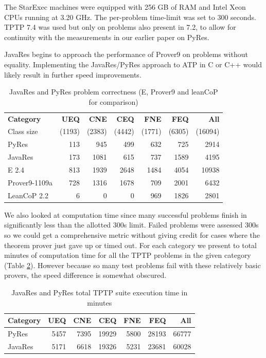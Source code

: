 \documentclass{llncs}
\begin{document}
The StarExec machines were equipped with 256 GB of RAM and Intel Xeon CPUs running at 3.20 GHz.
The per-problem time-limit was set to 300 seconds. TPTP 7.4 was used but only on problems
also present in 7.2, to allow for continuity with the measurements in our earlier paper
on PyRes.

JavaRes begins to approach the performance of Prover9 on problems without
equality.  Implementing the JavaRes/PyRes approach to ATP
in C or C++ would likely result in further speed improvements.

\begin{table}[tbh]
  \begin{tabular}{lrrrrrr}
    \hline
    \textbf{Category} & \textbf{UEQ} & \textbf{CNE} & \textbf{CEQ} & \textbf{FNE} & \textbf{FEQ} & \textbf{All}\\
    {\tiny Class size} & {\tiny (1193)} & {\tiny (2383)} & {\tiny (4442)} & {\tiny (1771)} & {\tiny (6305)} & {\tiny (16094)}\\
    \hline
    PyRes              &   113 &  945 &   499 &   632 &   725 &  2914 \\
    JavaRes            &   173 & 1081 &   615 &   737 &  1589 &  4195 \\
    \hline
    E 2.4              &   813 &  1939 &  2648 &  1484 &  4054 & 10938 \\
    Prover9-1109a      &   728 &  1316 &  1678 &   709 &  2001 &  6432 \\
    LeanCoP 2.2        &     6 &     0 &     0 &   969 &  1826 &  2801 \\
    \hline
  \end{tabular}
  \caption{JavaRes and PyRes problem correctness (E, Prover9 and leanCoP for comparison)}
  \label{tab:res}
\end{table}

We also looked at computation time since many successful problems finish in significantly less than the allotted
300s limit.  Failed problems were assessed 300s so we could get a comprehensive metric without giving credit
for cases where the theorem prover just gave up or timed out.  For each category we present to total minutes of computation time for all
the TPTP problems in the given category (Table \ref{tab:res2}). However because so many test problems fail with these
relatively basic provers, the speed difference is somewhat obscured.

\begin{table}[tbh]
  \begin{tabular}{lrrrrrr}
    \hline
    \textbf{Category} & \textbf{UEQ} & \textbf{CNE} & \textbf{CEQ} & \textbf{FNE} & \textbf{FEQ} & \textbf{All}\\
    \hline
    PyRes              &   5457 &  7395 &   19929 &   5800 &   28193 &  66777 \\
    JavaRes            &   5171 &  6618 &   19326 &   5231 &   23681 &  60028 \\
    \hline
  \end{tabular}
  \caption{JavaRes and PyRes total TPTP suite execution time in minutes}
  \label{tab:res2}
\end{table}
\end{document}
